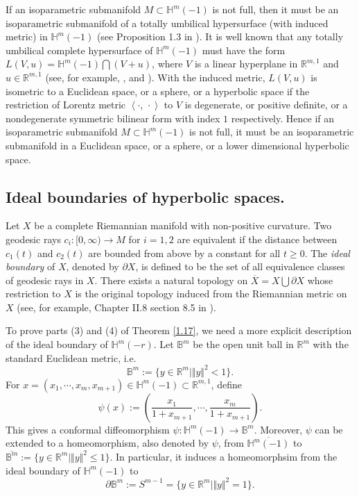 \documentclass[12pt]{article}
\begin{document}
If an isoparametric submanifold $M \subset \mathbb{H}^{m}(-1)$ is not full, then it must be an isoparametric
submanifold of a totally umbilical hypersurface (with induced metric) in $\mathbb{H}^{m}(-1)$ (see Proposition 1.3 in \cite{B.W}).
It is well known that any totally umbilical complete hypersurface of $\mathbb{H}^{m}(-1)$ must have the form
$L(V,u)=\mathbb{H}^{m}(-1)\bigcap (V+u)$, where $V$ is a linear hyperplane in  $\mathbb R^{m,1}$ and $u \in \mathbb R^{m,1}$ (see, for example, \cite{ABD}, \cite{BCO} and \cite{B.W}). With the induced metric,
$L(V,u)$ is isometric to a Euclidean space, or a sphere, or a hyperbolic space if the restriction of
Lorentz metric $\left<\cdot, \, \cdot\right>$ to $V$ is  degenerate, or positive definite, or a nondegenerate symmetric bilinear form with index $1$ respectively. Hence if an isoparametric submanifold $M \subset \mathbb{H}^{m}(-1)$ is not full, it must be
an isoparametric submanifold in a Euclidean space, or a sphere, or a lower dimensional hyperbolic space.



\subsection{Ideal boundaries of hyperbolic spaces.}


Let $X$ be a complete Riemannian manifold with non-positive curvature.
Two geodesic rays $c_i: [0, \infty) \longrightarrow M$ for $i=1, 2$ are equivalent if the distance between $c_1(t)$ and $c_2(t)$ are bounded from above by a constant for all $t \geq 0$.
The {\it ideal boundary} of $X$, denoted by $\partial X$, is defined to be the set of all equivalence classes of geodesic rays in $X$.
There exists a natural topology on $\overline{X}=X \bigcup \partial X$ whose restriction to $X$ is the original topology
induced from the Riemannian metric on $X$
(see, for example, Chapter II.8 section 8.5 in \cite{B.H}).


To prove parts (3) and (4) of Theorem \ref{1.17}, we need a more explicit description of the ideal boundary of $\mathbb{H}^{m}(-r)$.
Let $\mathbb B^m$ be the open unit ball in $\mathbb R^m$ with the standard Euclidean metric, i.e.
 \begin{equation} \label{eqn:ball}
 \mathbb B^m :=\{y \in \mathbb R^m \mid \Vert y \Vert^2<1\}.
 \end{equation}
For $x=(x_1, \cdots, x_m, x_{m+1})\in \mathbb{H}^{m}(-1) \subset {\mathbb R}^{m,1}$, define
\begin{equation}  \label{9.2}
 \psi(x) :=  \left( \frac{x_1}{1+x_{m+1}}, \cdots, \frac{x_m}{1+x_{m+1}} \right).
\end{equation}
This gives a conformal diffeomorphism $\psi: \mathbb{H}^{m}(-1) \longrightarrow \mathbb B^m$.
Moreover, $\psi$ can be extended to a homeomorphism, also denoted by $\psi$, from $\overline{\mathbb{H}^{m}(-1)}$
to $\overline{\mathbb B^m} :=\{y \in \mathbb R^m \mid \Vert  y \Vert^2 \leq 1\}$.
In particular, it induces a homeomorphsim from the  ideal boundary of ${\mathbb{H}^{m}(-1)}$
to
\[ \partial \mathbb{B}^m := S^{m-1}=\{y \in \mathbb R^m \mid \Vert y \Vert^2 = 1\}.\]
\end{document}
